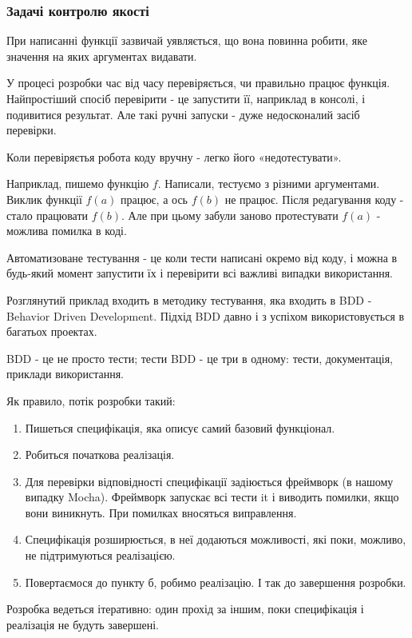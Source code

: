 \subsubsection{Задачі контролю якості}

При написанні функції зазвичай уявляється, що вона повинна робити, яке значення на яких аргументах видавати.

У процесі розробки час від часу перевіряється, чи правильно працює функція. Найпростіший спосіб перевірити - це запустити її, наприклад в консолі, і подивитися результат. Але такі ручні запуски - дуже недосконалий засіб перевірки.

Коли перевіряєтья робота коду вручну - легко його «недотестувати».

Наприклад, пишемо функцію $f$. Написали, тестуємо з різними аргументами. Виклик функції $f(a)$ працює, а ось $f(b)$ не працює. Після редагування коду - стало працювати $f(b)$. Але при цьому забули заново протестувати $f(a)$ - можлива помилка в коді.

Автоматизоване тестування - це коли тести написані окремо від коду, і можна в будь-який момент запустити їх і перевірити всі важливі випадки використання.


Розглянутий приклад входить в методику тестування, яка входить в BDD - Behavior Driven Development. Підхід BDD давно і з успіхом використовується в багатьох проектах.

BDD - це не просто тести; тести BDD - це три в одному: тести, документація, приклади використання.

Як правило, потік розробки такий:

\begin{enumerate}
	\item Пишеться специфікація, яка описує самий базовий функціонал.
	\item Робиться початкова реалізація.
	\item Для перевірки відповідності специфікації задіюється фреймворк (в нашому випадку Mocha). Фреймворк запускає всі тести it і виводить помилки, якщо вони виникнуть. При помилках вносяться виправлення.
	\item Специфікація розширюється, в неї додаються можливості, які поки, можливо, не підтримуються реалізацією.
	\item Повертаємося до пункту б, робимо реалізацію. І так до завершення розробки.
\end{enumerate}

Розробка ведеться ітеративно: один прохід за іншим, поки специфікація і реалізація не будуть завершені.
